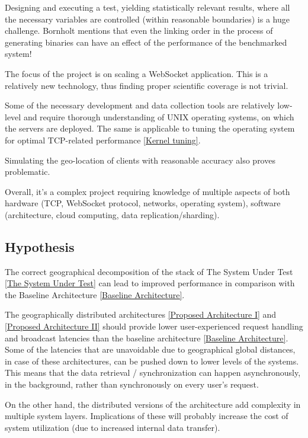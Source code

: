 \documentclass{uvamscse}
\begin{document}
Designing and executing a test, yielding statistically relevant results, where all the necessary variables are controlled (within reasonable boundaries) is a huge challenge. Bornholt \cite{BornBen} mentions that even the linking order in the process of generating binaries can have an effect of the performance of the benchmarked system!

The focus of the project is on scaling a WebSocket application. This is a relatively new technology, thus finding proper scientific coverage is not trivial.

Some of the necessary development and data collection tools are relatively low-level and require thorough understanding of UNIX operating systems, on which the servers are deployed. The same is applicable to tuning the operating system for optimal TCP-related performance \ref{Kernel tuning}.

Simulating the geo-location of clients with reasonable accuracy also proves problematic.

Overall, it’s a complex project requiring knowledge of multiple aspects of both hardware (TCP, WebSocket protocol, networks, operating system), software (architecture, cloud computing, data replication/sharding).

\subsection{Hypothesis}
The correct geographical decomposition of the stack of The System Under Test \ref{The System Under Test} can lead to improved performance in comparison with the Baseline Architecture \ref{Baseline Architecture}.

The geographically distributed architectures \ref{Proposed Architecture I} and \ref{Proposed Architecture II} should provide lower user-experienced request handling and broadcast latencies than the baseline architecture \ref{Baseline Architecture}. Some of the latencies that are unavoidable due to geographical global distances, in case of these architectures, can be pushed down to lower levels of the systems. This means that the data retrieval / synchronization can happen asynchronously, in the background, rather than synchronously on every user's request.


On the other hand, the distributed versions of the architecture add complexity in multiple system layers. Implications of these will probably increase the cost of system utilization (due to increased internal data transfer).
\end{document}
